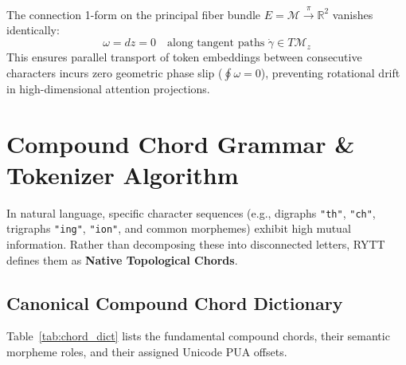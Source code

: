 \documentclass[11pt,oneside,letterpaper]{article}
\theoremstyle{sovereignstyle}
\begin{document}
The connection 1-form on the principal fiber bundle $E = \mathcal{M} \xrightarrow{\pi} \mathbb{R}^2$ vanishes identically:
\begin{equation}
\omega = dz = 0 \quad \text{along tangent paths } \dot{\gamma} \in T\mathcal{M}_z
\end{equation}
This ensures parallel transport of token embeddings between consecutive characters incurs zero geometric phase slip ($\oint \omega = 0$), preventing rotational drift in high-dimensional attention projections.

\section{Compound Chord Grammar \& Tokenizer Algorithm}

In natural language, specific character sequences (e.g., digraphs \texttt{"th"}, \texttt{"ch"}, trigraphs \texttt{"ing"}, \texttt{"ion"}, and common morphemes) exhibit high mutual information. Rather than decomposing these into disconnected letters, RYTT defines them as \textbf{Native Topological Chords}.

\subsection{Canonical Compound Chord Dictionary}
Table~\ref{tab:chord_dict} lists the fundamental compound chords, their semantic morpheme roles, and their assigned Unicode PUA offsets.
\end{document}
